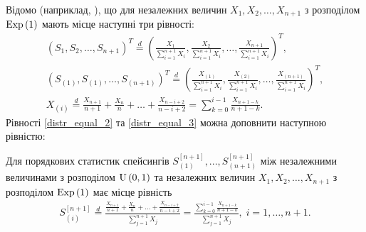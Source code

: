 Відомо (наприклад, \cite{Holst_1980}), що для незалежних величин 
$X_1, X_2, \dots, X_{n+1}$ з розподілом $\mathrm{Exp}\left(1\right)$
мають місце наступні три рівності:
\begin{gather}
    \label{distr_equal_1}
    \left(
        S_1, S_2, \dots, S_{n+1}
    \right)^T
    \overset{d}{=}
    \left(
        \frac{X_1}{\sum_{i=1}^{n+1} X_i},
        \frac{X_2}{\sum_{i=1}^{n+1} X_i},
        \dots,
        \frac{X_{n+1}}{\sum_{i=1}^{n+1} X_i}
    \right)^T, \\
    \label{distr_equal_2}
    \left(
        S_{(1)}, S_{(1)}, \dots, S_{(n+1)}
    \right)^T
    \overset{d}{=}
    \left(
        \frac{X_{(1)}}{\sum_{i=1}^{n+1} X_i},
        \frac{X_{(2)}}{\sum_{i=1}^{n+1} X_i},
        \dots,
        \frac{X_{(n+1)}}{\sum_{i=1}^{n+1} X_i}
    \right)^T, \\
    \label{distr_equal_3}
    X_{(i)} \overset{d}{=}
    \frac{X_{n+1}}{n+1} + \frac{X_{n}}{n} + \dots + \frac{X_{n-i+2}}{n-i+2} = 
    \sum_{k=0}^{i-1} \frac{X_{n+1-k}}{n+1-k}.
\end{gather}
Рівності \eqref{distr_equal_2} та \eqref{distr_equal_3}
можна доповнити наступною рівністю:
\begin{lemma}\label{distr_equal}
    Для порядкових статистик спейсингів 
    $S_{(1)}^{[n+1]}, ..., S_{(n+1)}^{[n+1]}$
    між незалежними величинами з розподілом $\mathrm{U}\left(0, 1\right)$
    та незалежних величин 
    $X_1, X_2, \dots, X_{n+1}$ з розподілом $\mathrm{Exp}\left(1\right)$ має місце
    рівність 
    \begin{gather}\label{distr_equal_4}
        S_{(i)}^{[n+1]} \overset{d}{=}
        \frac{
            \frac{X_{n+1}}{n+1} + \frac{X_{n}}{n} + \dots + \frac{X_{n-i+2}}{n-i+2}
        }{
            \sum_{j=1}^{n+1} X_j
        } = \frac{
            \sum_{k=0}^{i-1} \frac{X_{n+1-k}}{n+1-k}
        }{
            \sum_{j=1}^{n+1} X_j
        }, \; i = 1, \dots, n+1.
    \end{gather}
\end{lemma}
